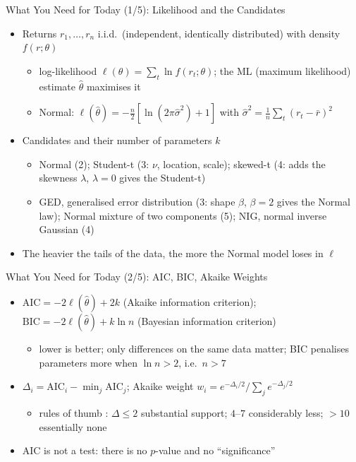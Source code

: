 \begin{frame}{What You Need for Today (1/5): Likelihood and the Candidates}
\itemsize{\small}
\begin{itemize}
    \item Returns $r_1, \dots, r_n$ i.i.d.\ (independent, identically distributed) with density $f(r; \theta)$
    \begin{itemize}
        \item log-likelihood $\ell(\theta) = \sum_t \ln f(r_t; \theta)$; the ML (maximum likelihood) estimate $\hat\theta$ maximises it
        \item Normal: $\ell(\hat\theta) = -\frac{n}{2}[\ln(2\pi\hat\sigma^2) + 1]$ with $\hat\sigma^2 = \frac{1}{n}\sum_t (r_t - \bar r)^2$
    \end{itemize}
    \item Candidates and their number of parameters $k$
    \begin{itemize}
        \item Normal (2); Student-t (3: $\nu$, location, scale); skewed-t (4: adds the skewness $\lambda$, $\lambda = 0$ gives the Student-t)
        \item GED, generalised error distribution (3: shape $\beta$, $\beta = 2$ gives the Normal law); Normal mixture of two components (5); NIG, normal inverse Gaussian (4)
    \end{itemize}
    \item The heavier the tails of the data, the more the Normal model loses in $\ell$
\end{itemize}
\end{frame}

\begin{frame}{What You Need for Today (2/5): AIC, BIC, Akaike Weights}
\itemsize{\small}
\begin{itemize}
    \item $\mathrm{AIC} = -2\ell(\hat\theta) + 2k$ (Akaike information criterion); $\mathrm{BIC} = -2\ell(\hat\theta) + k\ln n$ (Bayesian information criterion)
    \begin{itemize}
        \item lower is better; only differences on the same data matter; BIC penalises parameters more when $\ln n > 2$, i.e.\ $n > 7$
    \end{itemize}
    \item $\Delta_i = \mathrm{AIC}_i - \min_j \mathrm{AIC}_j$; Akaike weight $w_i = e^{-\Delta_i/2}/\sum_j e^{-\Delta_j/2}$
    \begin{itemize}
        \item rules of thumb : $\Delta \le 2$ substantial support; $4$--$7$ considerably less; $> 10$ essentially none
    \end{itemize}
    \item AIC is not a test: there is no $p$-value and no ``significance''
\end{itemize}
\end{frame}

